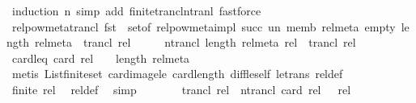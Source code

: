 \begin{isabellebody}
\endisadelimproof
%
\isatagproof
{}\isamarkupfalse%
\ {\isacharparenleft}{\kern0pt}induction\ n{\isacharcomma}{\kern0pt}\ simp\ add{\isacharcolon}{\kern0pt}\ finite{\isacharunderscore}{\kern0pt}trancl{\isacharunderscore}{\kern0pt}ntranl{\isacharcomma}{\kern0pt}\ fastforce{\isacharparenright}{\kern0pt}%
\endisatagproof
{\isafoldproof}%
%
\isadelimproof
\isanewline
%
\endisadelimproof
\isanewline
{}\isamarkupfalse%
\ relpow{\isacharunderscore}{\kern0pt}meta{\isacharunderscore}{\kern0pt}trancl{\isacharcolon}{\kern0pt}\ {\isachardoublequoteopen}fst\ {\isacharbackquote}{\kern0pt}\ set{\isacharunderscore}{\kern0pt}of\ {\isacharparenleft}{\kern0pt}relpow{\isacharunderscore}{\kern0pt}meta{\isacharunderscore}{\kern0pt}impl\ succ\ un\ memb\ rel{\isacharunderscore}{\kern0pt}meta\ empty\ {\isacharparenleft}{\kern0pt}length\ rel{\isacharunderscore}{\kern0pt}meta{\isacharparenright}{\kern0pt}{\isacharparenright}{\kern0pt}\ {\isacharequal}{\kern0pt}\ trancl\ rel{\isachardoublequoteclose}\isanewline
%
\isadelimproof
%
\endisadelimproof
%
\isatagproof
{}\isamarkupfalse%
\ {\isacharminus}{\kern0pt}\isanewline
\ \ \isamarkupfalse%
\ {\isachardoublequoteopen}ntrancl\ {\isacharparenleft}{\kern0pt}length\ rel{\isacharunderscore}{\kern0pt}meta{\isacharparenright}{\kern0pt}\ rel\ {\isacharequal}{\kern0pt}\ trancl\ rel{\isachardoublequoteclose}\isanewline
\ \ \isamarkupfalse%
\isanewline
\ \ \ \ \isamarkupfalse%
\ card{\isacharunderscore}{\kern0pt}leq{\isacharcolon}{\kern0pt}\ {\isachardoublequoteopen}card\ rel\ {\isacharminus}{\kern0pt}\ {}\ {\isasymle}\ length\ rel{\isacharunderscore}{\kern0pt}meta{\isachardoublequoteclose}\isanewline
\ \ \ \ \ \ \isamarkupfalse%
\ {\isacharparenleft}{\kern0pt}metis\ List{\isachardot}{\kern0pt}finite{\isacharunderscore}{\kern0pt}set\ card{\isacharunderscore}{\kern0pt}image{\isacharunderscore}{\kern0pt}le\ card{\isacharunderscore}{\kern0pt}length\ diff{\isacharunderscore}{\kern0pt}le{\isacharunderscore}{\kern0pt}self\ le{\isacharunderscore}{\kern0pt}trans\ rel{\isacharunderscore}{\kern0pt}def{\isacharparenright}{\kern0pt}\isanewline
\ \ \ \ \isamarkupfalse%
\ {\isachardoublequoteopen}finite\ rel{\isachardoublequoteclose}\ \isamarkupfalse%
\ rel{\isacharunderscore}{\kern0pt}def\ \isamarkupfalse%
\ simp\isanewline
\ \ \ \ \isamarkupfalse%
\ \isamarkupfalse%
\ {\isachardoublequoteopen}trancl\ rel\ {\isacharequal}{\kern0pt}\ ntrancl\ {\isacharparenleft}{\kern0pt}card\ rel\ {\isacharminus}{\kern0pt}\ {}{\isacharparenright}{\kern0pt}\ rel{\isachardoublequoteclose}\ \isamarkupfalse%

\end{isabellebody}
